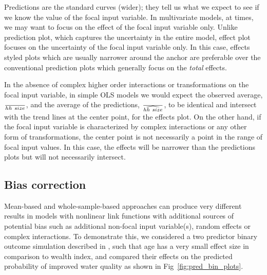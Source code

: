 Predictions are the standard curves (wider); they tell us what we expect to see if we know the value of the focal input variable. In multivariate models, at times, we may want to focus on the effect of the focal input variable only. Unlike prediction plot, which captures the uncertainty in the entire model, effect plot focuses on the uncertainty of the focal input variable only. In this case, effects styled plots which are usually narrower around the anchor are preferable over the conventional prediction plots which generally focus on the \emph{total} effects. 

In the absence of complex higher order interactions or transformations on the focal input variable, in simple OLS models we would expect the observed average, $\over{hh~size}$, and the average of the predictions, $\over{\widehat{hh~size}}$, to be identical and intersect with the trend lines at the center point, for the effects plot. On the other hand, if the focal input variable is characterized by complex interactions or any other form of transformations, the center point is not necessarily a point in the range of focal input values. In this case, the effects will be narrower than the predictions plots but will not necessarily intersect. 


\subsection{Bias correction}

Mean-based and whole-sample-based approaches can produce very different results in models with nonlinear link functions with additional sources of potential bias such as additional non-focal input variable(s), random effects or complex interactions. To demonstrate this, we considered a two predictor binary outcome simulation described in , such that age has a very small effect size in comparison to wealth index, and compared their effects on the predicted probability of improved water quality as shown in Fig~\ref{fig:pred_bin_plots}. 

